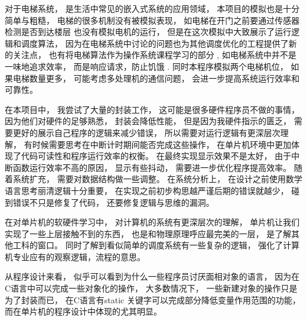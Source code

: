 \documentclass[../main.tex]{subfiles} %
\begin{document}
对于电梯系统，
是生活中常见的嵌入式系统的应用领域，
本项目的模拟也是十分简单与粗糙，
电梯的很多机制没有被模拟表现，
如电梯在开门之前要通过传感器检测是否到达楼层
也没有模拟电机的运行，
但是在这次模拟中大致展示了运行逻辑和调度算法，
因为在电梯系统中讨论的问题也为其他调度优化的工程提供了新的关注点，
也有将电梯算法作为操作系统课程学习的部分
,
如电梯系统中并不是一味地追求效率，
而是响应请求，防止饥饿
.
同时本程序模拟两个电梯机位，
如果电梯数量更多，
可能考虑多处理机的通信问题，
会进一步提高系统运行效率和可靠性。



在本项目中，
我尝试了大量的封装工作，
这可能是很多硬件程序员不做的事情，
因为他们对硬件的足够熟悉，
封装会降低性能，
但是因为我硬件指示的匮乏，
需要更好的展示自己程序的逻辑来减少错误，
所以需要对运行逻辑有更深层次理解，
有时候需要思考在中断计时期间能否完成这些操作，
在单片机环境中更加体现了代码可读性和程序运行效率的权衡。
在最终实现显示效果不是太好，
由于中断函数运行效率不高的原因，
显示有些抖动，
需要进一步优化程序提高效率。
随着系统扩充，
需要对数据结构做一些调整。
在系统分析上，
在设计之前使用数学语言思考丽清逻辑十分重要，
在实现之前初步构思越严谨后期的错误就越少，
碰到错误不只是修复了代码，
还要修复逻辑与思维的漏洞。

在对单片机的软硬件学习中，
对计算机的系统有更深层次的理解，
单片机让我们实现了一些上层接触不到的东西，
也是和物理原理呼应最完美的一层，
是了解其他工科的窗口。
同时了解到看似简单的调度系统有一些复杂的逻辑，
强化了计算机专业应有的观察逻辑，流程的意思。


从程序设计来看，
似乎可以看到为什么一些程序员讨厌面相对象的语言，
因为在C语言中可以完成一些对象化的操作，
大多数情况下，
一些新建对象的操作只是为了封装而已，
在C语言有static 关键字可以完成部分降低变量作用范围的功能，
而在单片机的程序设计中体现的尤其明显。
\end{document}
